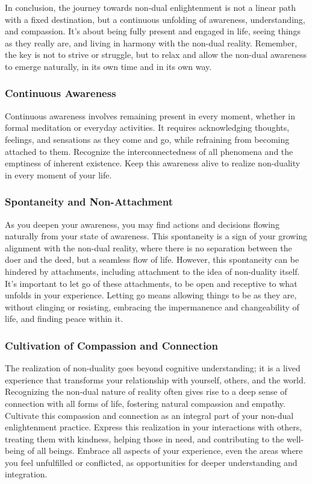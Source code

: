 \documentclass[12pt,openany]{book}
\begin{document}
In conclusion, the journey towards non-dual enlightenment is not a linear path with a fixed destination, but a continuous unfolding of awareness, understanding, and compassion. It's about being fully present and engaged in life, seeing things as they really are, and living in harmony with the non-dual reality. Remember, the key is not to strive or struggle, but to relax and allow the non-dual awareness to emerge naturally, in its own time and in its own way.

\subsubsection*{Continuous Awareness}
Continuous awareness involves remaining present in every moment, whether in formal meditation or everyday activities. It requires acknowledging thoughts, feelings, and sensations as they come and go, while refraining from becoming attached to them. Recognize the interconnectedness of all phenomena and the emp\-tiness of inherent existence. Keep this awareness alive to realize non-duality in every moment of your life.

\subsubsection*{Spontaneity and Non-Attachment}
As you deepen your awareness, you may find actions and decisions flowing naturally from your state of awareness. This spontaneity is a sign of your growing alignment with the non-dual reality, where there is no separation between the doer and the deed, but a seamless flow of life. However, this spontaneity can be hindered by attachments, including attachment to the idea of non-duality itself. It's important to let go of these attachments, to be open and receptive to what unfolds in your experience. Letting go means allowing things to be as they are, without clinging or resisting, embracing the impermanence and changeability of life, and finding peace within it.

\subsubsection*{Cultivation of Compassion and Connection}
The realization of non-duality goes beyond cognitive understanding; it is a lived experience that transforms your relationship with yourself, others, and the world. Recognizing the non-dual nature of reality often gives rise to a deep sense of connection with all forms of life, fostering natural compassion and empathy. Cultivate this compassion and connection as an integral part of your non-dual enlightenment practice. Express this realization in your interactions with others, treating them with kindness, helping those in need, and contributing to the well-being of all beings. Embrace all aspects of your experience, even the areas where you feel unfulfilled or conflicted, as opportunities for deeper understanding and integration.
\end{document}
